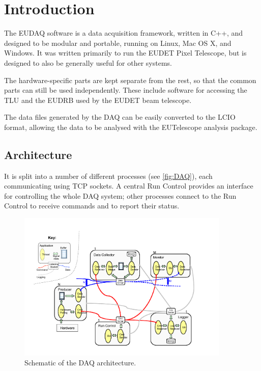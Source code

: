 \section{Introduction}
The EUDAQ software is a data acquisition framework, written in C++,
and designed to be modular and portable, running on Linux, Mac OS X, and Windows.
It was written primarily to run the EUDET Pixel Telescope\cite{Roloff:2009zza},
but is designed to also be generally useful for other systems.

The hardware-specific parts are kept separate from the rest,
so that the common parts can still be used independently.
These include software for accessing the \gls{TLU} and the \gls{EUDRB} used by the EUDET beam telescope.

The data files generated by the DAQ can be easily converted to the \gls{LCIO} format,
allowing the data to be analysed with the EUTelescope\cite{eutel2008} analysis package.

\subsection{Architecture}
It is split into a number of different processes (see \autoref{fig:DAQ}),
each communicating using TCP sockets.
A central Run Control provides an interface for controlling the whole DAQ system;
other processes connect to the Run Control to receive commands and to report their status.

\begin{figure}[htb]
  \begin{center}
    \includegraphics[width=0.9\textwidth]{images/DAQ}
    \caption{Schematic of the DAQ architecture.}
    \label{fig:DAQ}
  \end{center}
\end{figure}

